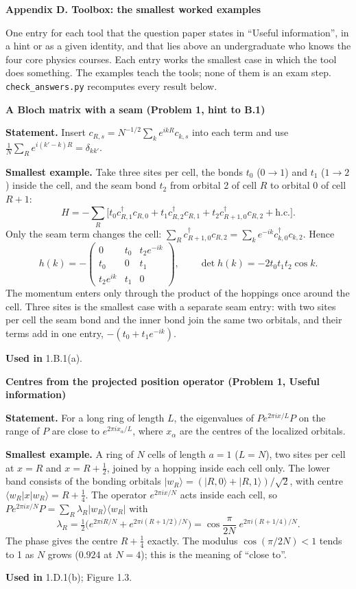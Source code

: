 \documentclass[11pt,a4paper]{article}
\newcommand{\ket}[1]{\lvert #1\rangle}
\newcommand{\bra}[1]{\langle #1\rvert}
\newcommand{\hc}{\mathrm{h.c.}}
\newcommand{\pagetitle}[1]{{\large\bfseries\color{ink}#1}\par\vspace{4pt}}
\newcommand{\smallheading}[1]{\par\Needspace{6\baselineskip}\medskip\textbf{#1}\par}
\begin{document}
\clearpage
\pagetitle{Appendix D. Toolbox: the smallest worked examples}
One entry for each tool that the question paper states in ``Useful information'', in a hint or as a given identity, and that lies above an undergraduate who knows the four core physics courses. Each entry works the smallest case in which the tool does something. The examples teach the tools; none of them is an exam step. \texttt{check\_answers.py} recomputes every result below.

\smallheading{A Bloch matrix with a seam (Problem 1, hint to B.1)}
\textbf{Statement.} Insert $c_{R,s}=N^{-1/2}\sum_ke^{ikR}c_{k,s}$ into each term and use $\frac1N\sum_Re^{i(k'-k)R}=\delta_{kk'}$.\par
\textbf{Smallest example.} Take three sites per cell, the bonds $t_0$ ($0\to1$) and $t_1$ ($1\to2$) inside the cell, and the seam bond $t_2$ from orbital 2 of cell $R$ to orbital 0 of cell $R+1$:
\[
H=-\sum_R\big[t_0c_{R,1}^\dagger c_{R,0}+t_1c_{R,2}^\dagger c_{R,1}+t_2c_{R+1,0}^\dagger c_{R,2}+\hc\big].
\]
Only the seam term changes the cell: $\sum_Rc_{R+1,0}^\dagger c_{R,2}=\sum_ke^{-ik}c_{k,0}^\dagger c_{k,2}$. Hence
\[
h(k)=-\begin{pmatrix}0&t_0&t_2e^{-ik}\\t_0&0&t_1\\t_2e^{ik}&t_1&0\end{pmatrix},
\qquad
\det h(k)=-2t_0t_1t_2\cos k .
\]
The momentum enters only through the product of the hoppings once around the cell. Three sites is the smallest case with a separate seam entry: with two sites per cell the seam bond and the inner bond join the same two orbitals, and their terms add in one entry, $-(t_0+t_1e^{-ik})$.\par
\textbf{Used in} 1.B.1(a).

\smallheading{Centres from the projected position operator (Problem 1, Useful information)}
\textbf{Statement.} For a long ring of length $L$, the eigenvalues of $Pe^{2\pi ix/L}P$ on the range of $P$ are close to $e^{2\pi ix_\alpha/L}$, where $x_\alpha$ are the centres of the localized orbitals.\par
\textbf{Smallest example.} A ring of $N$ cells of length $a=1$ ($L=N$), two sites per cell at $x=R$ and $x=R+\tfrac12$, joined by a hopping inside each cell only. The lower band consists of the bonding orbitals $\ket{w_R}=(\ket{R,0}+\ket{R,1})/\sqrt2$, with centre $\bra{w_R}x\ket{w_R}=R+\tfrac14$. The operator $e^{2\pi ix/N}$ acts inside each cell, so $Pe^{2\pi ix/N}P=\sum_R\lambda_R\ket{w_R}\bra{w_R}$ with
\[
\lambda_R=\tfrac12\big(e^{2\pi iR/N}+e^{2\pi i(R+1/2)/N}\big)=\cos\frac{\pi}{2N}\;e^{2\pi i(R+1/4)/N}.
\]
The phase gives the centre $R+\tfrac14$ exactly. The modulus $\cos(\pi/2N)<1$ tends to 1 as $N$ grows ($0.924$ at $N=4$); this is the meaning of ``close to''.\par
\textbf{Used in} 1.D.1(b); Figure 1.3.
\end{document}
